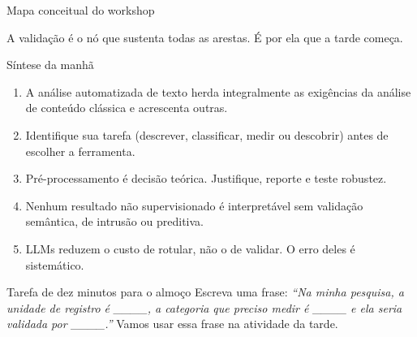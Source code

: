 \documentclass[11pt,aspectratio=169]{beamer}
\begin{document}
\begin{frame}{Mapa conceitual do workshop}
\centering
{}
\vspace{0.15cm}

\small A validação é o nó que sustenta todas as arestas. É por ela que a tarde
começa.
\end{frame}

\begin{frame}{Síntese da manhã}
\begin{enumerate}
  \item A análise automatizada de texto herda integralmente as exigências da
        análise de conteúdo clássica e acrescenta outras.
  \item Identifique sua tarefa (descrever, classificar, medir ou descobrir)
        antes de escolher a ferramenta.
  \item Pré-processamento é decisão teórica. Justifique, reporte e teste
        robustez.
  \item Nenhum resultado não supervisionado é interpretável sem validação
        semântica, de intrusão ou preditiva.
  \item LLMs reduzem o custo de rotular, não o de validar. O erro deles é
        sistemático.
\end{enumerate}
\vspace{0.25cm}
\begin{block}{Tarefa de dez minutos para o almoço}
\small
Escreva uma frase: \emph{``Na minha pesquisa, a unidade de registro é \_\_\_\_,
a categoria que preciso medir é \_\_\_\_ e ela seria validada por \_\_\_\_.''}
Vamos usar essa frase na atividade da tarde.
\end{block}
\end{frame}
\end{document}
